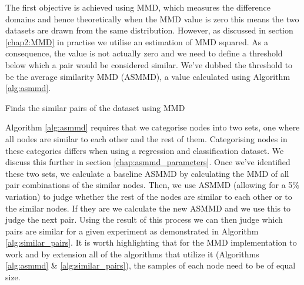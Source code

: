 \documentclass{mpaper}
\begin{document}
The first objective is achieved using MMD, which measures the difference domains and hence theoretically when the MMD value is zero this means the two datasets are drawn from the same distribution. However, as discussed in section \ref{chap2:MMD} in practise we utilise an estimation of MMD squared. As a consequence, the value is not actually zero and we need to define a threshold below which a pair would be considered similar. We've dubbed the threshold to be the average similarity MMD (ASMMD), a value calculated using Algorithm \ref{alg:asmmd}. 

\begin{algorithm}
    \DontPrintSemicolon
    \caption{Finds the similar pairs of the dataset using MMD
    }\label{alg:similar_pairs}
    
    
\end{algorithm}

Algorithm \ref{alg:asmmd} requires that we categorise nodes into two sets, one where all nodes are similar to each other and the rest of them. Categorising nodes in these categories differs when using a regression and classification dataset. We discuss this further in section \ref{chap:asmmd_parameters}. Once we've identified these two sets, we calculate a baseline ASMMD by calculating the MMD of all pair combinations of the similar nodes. Then, we use ASMMD (allowing for a 5\% variation) to judge whether the rest of the nodes are similar to each other or to the similar nodes. If they are we calculate the new ASMMD and we use this to judge the next pair. Using the result of this process we can then judge which pairs are similar for a given experiment as demonstrated in Algorithm  \ref{alg:similar_pairs}. It is worth highlighting that for the MMD implementation to work and by extension all of the algorithms that utilize it (Algorithms \ref{alg:asmmd} \& \ref{alg:similar_pairs}), the samples of each node need to be of equal size.
\end{document}
